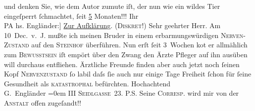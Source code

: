\begin{ledgroupsized}[t]{13cm}
           \pstart
           \noindent{}und denken Sie, wie dem Autor zumute iſt, der nun wie ein wildes Tier eingeſperrt
                  ſchmachtet, ſeit \uline{5} Monaten!!!\pend
           \pstart
           Ihr{\\}\spacefill\mbox{PA}\pend
           \pstart
           \noindent{}{\pb}{[}hs. Engländer:{]} \uline{Zur Aufklärung}. \textsc{(Diskret!)}\pend
           \pstart{}Sehr geehrter Herr.\pend\pstart
           Am 10 Dec. v. J. mußte ich meinen Bruder in einem erbarmungswürdigen \textsc{Nerven-Zustand} auf den \textsc{Steinhof} überführen.\pend
           \pstart
           Nun erſt ſeit 3 {\pb}Wochen ko{\geminationm}t er allmählich zum \textsc{Bewusstsein}{ }{\kaufmannsund} iſt empört über den Zwang den Ärzte{ }{\kaufmannsund} Pfleger auf ihn ausüben {\kaufmannsund}
               will durchaus entfliehen. Ärztliche {\pb}Freunde finden aber auch jetzt noch ſeinen Kopf {\kaufmannsund}{ }\textsc{Nervenzustand} ſo labil daſs ſie auch nur einige Tage
               Freiheit ſchon für ſeine Gesundheit als \textsc{katastrophal}
               befürchten.\pend
           \pstart
           Hochachtend{\\[\baselineskip]}\spacefill\mbox{G. Engländer}\pend
           \leftskip=0em{}\pstart
           \noindent{}III \textsc{Seidlgasse} 23.\pend
           \pstart
           P.S. Seine \textsc{Correſp}. wird mir von der \textsc{Anstalt} offen zugeſandt!!\pend
           \endnumbering{}\end{ledgroupsized}  \newcommand{\dateiname}{L02120}\newcommand{\titel}{Peter Altenberg und Georg Engländer an Arthur Schnitzler, [Mitte April] 1913}\newcommand{\editorInnen}{Martin Anton Müller und Gerd-Hermann Susen}
      